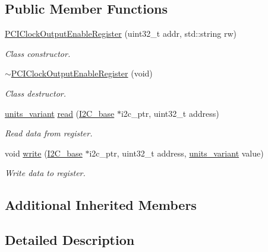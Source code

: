 \subsection*{Public Member Functions}
\begin{DoxyCompactItemize}
\item 
\hyperlink{class_p_c_i_clock_output_enable_register_a6fff1442b002df2ae6c79181b3c8c179}{P\+C\+I\+Clock\+Output\+Enable\+Register} (uint32\+\_\+t addr, std\+::string rw)
\begin{DoxyCompactList}\small\item\em Class constructor. \end{DoxyCompactList}\item 
\hyperlink{class_p_c_i_clock_output_enable_register_aff8f206832209aafe050bf6747df773c}{$\sim$\+P\+C\+I\+Clock\+Output\+Enable\+Register} (void)
\begin{DoxyCompactList}\small\item\em Class destructor. \end{DoxyCompactList}\item 
\hyperlink{units__define_8hpp_a95d46867fa79633565c288a0b4bd5408}{units\+\_\+variant} \hyperlink{class_p_c_i_clock_output_enable_register_a045c8a20c9ac76b937f7224aaba4a4ff}{read} (\hyperlink{class_i2_c__base}{I2\+C\+\_\+base} $\ast$i2c\+\_\+ptr, uint32\+\_\+t address)
\begin{DoxyCompactList}\small\item\em Read data from register. \end{DoxyCompactList}\item 
void \hyperlink{class_p_c_i_clock_output_enable_register_a85f345cbd4dac441680dbfebd20a15c0}{write} (\hyperlink{class_i2_c__base}{I2\+C\+\_\+base} $\ast$i2c\+\_\+ptr, uint32\+\_\+t address, \hyperlink{units__define_8hpp_a95d46867fa79633565c288a0b4bd5408}{units\+\_\+variant} value)
\begin{DoxyCompactList}\small\item\em Write data to register. \end{DoxyCompactList}\end{DoxyCompactItemize}
\subsection*{Additional Inherited Members}


\subsection{Detailed Description}


